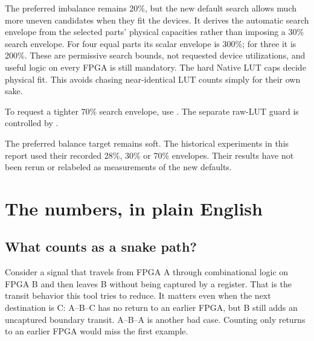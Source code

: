 \documentclass[11pt]{article}
\begin{document}
The preferred imbalance remains 20\%, but the new default search allows much more uneven candidates when they fit the devices. It derives the automatic search envelope from the selected parts' physical capacities rather than imposing a 30\% search envelope. For four equal parts its scalar envelope is 300\%; for three it is 200\%. These are permissive search bounds, not requested device utilizations, and useful logic on every FPGA is still mandatory. The hard Native LUT caps decide physical fit. This avoids chasing near-identical LUT counts simply for their own sake.

To request a tighter 70\% search envelope, use . The separate raw-LUT guard is controlled by .

The preferred balance target remains soft. The historical experiments in this report used their recorded 28\%, 30\% or 70\% envelopes. Their results have not been rerun or relabeled as measurements of the new defaults.

\section{The numbers, in plain English}

\subsection{What counts as a snake path?}

Consider a signal that travels from FPGA A through combinational logic on FPGA B and then leaves B without being captured by a register. That is the transit behavior this tool tries to reduce. It matters even when the next destination is C: A--B--C has no return to an earlier FPGA, but B still adds an uncaptured boundary transit. A--B--A is another bad case. Counting only returns to an earlier FPGA would miss the first example.
\end{document}

